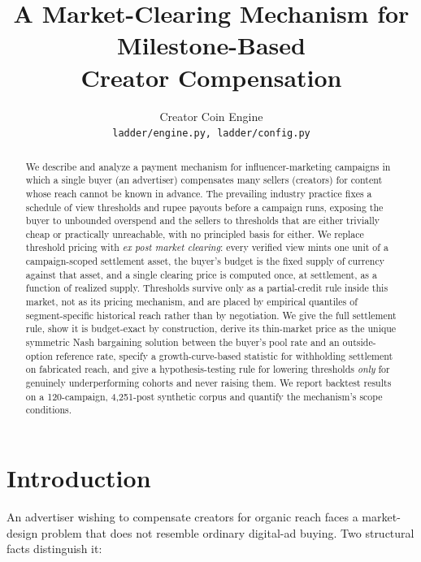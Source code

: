 \documentclass[11pt]{article}
\title{\Large\bfseries A Market-Clearing Mechanism for Milestone-Based\\Creator Compensation}
\author{
Creator Coin Engine\\
\small\texttt{ladder/engine.py, ladder/config.py}
}
\date{}
\begin{document}
\maketitle

\begin{abstract}
\noindent
We describe and analyze a payment mechanism for influencer-marketing campaigns in which a single
buyer (an advertiser) compensates many sellers (creators) for content whose reach cannot be known
in advance. The prevailing industry practice fixes a schedule of view thresholds and rupee payouts
before a campaign runs, exposing the buyer to unbounded overspend and the sellers to thresholds
that are either trivially cheap or practically unreachable, with no principled basis for either.
We replace threshold pricing with \emph{ex post market clearing}: every verified view mints one
unit of a campaign-scoped settlement asset, the buyer's budget is the fixed supply of currency
against that asset, and a single clearing price is computed once, at settlement, as a function of
realized supply. Thresholds survive only as a partial-credit rule inside this market, not as its
pricing mechanism, and are placed by empirical quantiles of segment-specific historical reach
rather than by negotiation. We give the full settlement rule, show it is budget-exact by
construction, derive its thin-market price as the unique symmetric Nash bargaining solution between
the buyer's pool rate and an outside-option reference rate, specify a growth-curve-based statistic
for withholding settlement on fabricated reach, and give a hypothesis-testing rule for lowering
thresholds \emph{only} for genuinely underperforming cohorts and never raising them. We report
backtest results on a 120-campaign, 4{,}251-post synthetic corpus and quantify the mechanism's
scope conditions.
\end{abstract}

\section{Introduction}

An advertiser wishing to compensate creators for organic reach faces a market-design problem that
does not resemble ordinary digital-ad buying. Two structural facts distinguish it:
\end{document}
